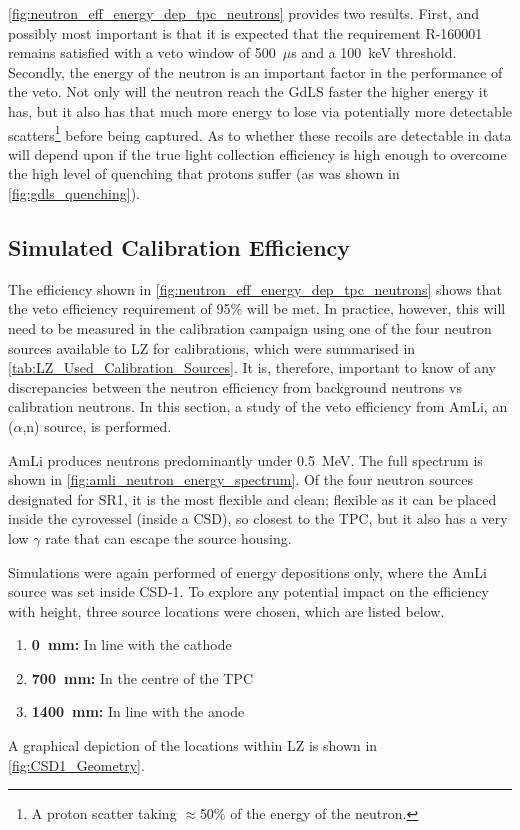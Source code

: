 

\par
\autoref{fig:neutron_eff_energy_dep_tpc_neutrons} provides two results.
First, and possibly most important is that it is expected that the requirement R-160001 remains satisfied with a veto window of 500~$\mu$s and a 100~keV threshold.
Secondly, the energy of the neutron is an important factor in the performance of the veto.
Not only will the neutron reach the GdLS faster the higher energy it has, but it also has that much more energy to lose via potentially more detectable scatters\footnote{A proton scatter taking $\approx$50\% of the energy of the neutron.} before being captured.
As to whether these recoils are detectable in data will depend upon if the true light collection efficiency is high enough to overcome the high level of quenching that protons suffer (as was shown in \autoref{fig:gdls_quenching}).

\subsection{Simulated Calibration Efficiency}
\par
The efficiency shown in \autoref{fig:neutron_eff_energy_dep_tpc_neutrons} shows that the veto efficiency requirement of 95\% will be met.
In practice, however, this will need to be measured in the calibration campaign using one of the four neutron sources available to LZ for calibrations, which were summarised in \autoref{tab:LZ_Used_Calibration_Sources}.
It is, therefore, important to know of any discrepancies between the neutron efficiency from background neutrons vs calibration neutrons.
In this section, a study of the veto efficiency from AmLi, an ($\alpha$,n) source, is performed.
\par
AmLi produces neutrons predominantly under 0.5~MeV.
The full spectrum is shown in \autoref{fig:amli_neutron_energy_spectrum}.
Of the four neutron sources designated for SR1, it is the most flexible and clean; flexible as it can be placed inside the cyrovessel (inside a CSD), so closest to the TPC, but it also has a very low $\gamma$ rate that can escape the source housing.



\par
Simulations were again performed of energy depositions only, where the AmLi source was set inside CSD-1.
To explore any potential impact on the efficiency with height, three source locations were chosen, which are listed below.
\begin{enumerate}
    \item \textbf{0~mm:} In line with the cathode
    \item \textbf{700~mm:} In the centre of the TPC
    \item \textbf{1400~mm:} In line with the anode
\end{enumerate}
A graphical depiction of the locations within LZ is shown in \autoref{fig:CSD1_Geometry}. 

